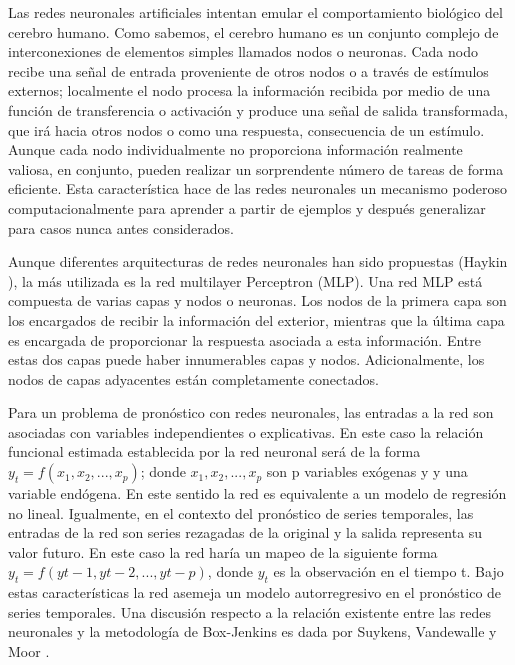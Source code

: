 \hspace*{0.4 cm} Las redes neuronales artificiales intentan emular el comportamiento biol\'ogico del cerebro humano. Como sabemos, el cerebro humano es un conjunto complejo de interconexiones de elementos simples llamados nodos o neuronas. Cada nodo recibe una se\~nal de entrada proveniente de otros nodos o a trav\'es de est\'imulos externos; localmente el nodo procesa la informaci\'on recibida por medio de una funci\'on de transferencia o activaci\'on y produce una se\~nal de salida transformada, que ir\'a hacia otros nodos o como una respuesta, consecuencia de un est\'imulo. Aunque cada nodo individualmente no proporciona informaci\'on realmente valiosa, en conjunto, pueden realizar un sorprendente n\'umero de tareas de forma eficiente. Esta caracter\'istica hace de las redes neuronales un mecanismo poderoso computacionalmente para aprender a partir de ejemplos y despu\'es generalizar para casos nunca antes considerados.


\hspace*{0.4 cm} Aunque diferentes arquitecturas de redes neuronales han sido propuestas (Haykin \cite{Ha}), la m\'as utilizada es la red multilayer Perceptron (MLP). Una red MLP est\'a compuesta de varias capas y nodos o neuronas. Los nodos de la primera capa son los encargados de recibir la informaci\'on del exterior, mientras que la \'ultima capa es encargada de proporcionar la respuesta asociada a esta informaci\'on. Entre estas dos capas puede haber innumerables capas y nodos. Adicionalmente, los nodos de capas adyacentes est\'an completamente conectados.

\hspace*{0.4 cm} Para un problema de pron\'ostico con redes neuronales, las entradas a la red son asociadas con variables independientes o explicativas. En este caso la relaci\'on funcional estimada establecida por la red neuronal ser\'a de la forma $y_{t}=f(x_{1}, x_{2},..., x_{p})$; donde $x_{1}, x_{2},..., x_{p}$ son p variables ex\'ogenas y y una variable end\'ogena. En este sentido la red es equivalente a un modelo de regresi\'on no lineal. Igualmente, en el contexto del pron\'ostico de series temporales, las entradas de la red son series rezagadas de la original y la salida representa su valor futuro. En este caso la red har\'ia un mapeo de la siguiente forma $y_{t}= f (y{t-1}, y{t-2}, ..., y{t-p})$, donde $y_{t}$ es la observaci\'on en el tiempo t. Bajo estas caracter\'isticas la red asemeja un modelo autorregresivo en el pron\'ostico de series temporales. Una discusi\'on respecto a la relaci\'on existente entre las redes neuronales y la metodolog\'ia de Box-Jenkins es dada por Suykens, Vandewalle y Moor \cite{SVM}.

